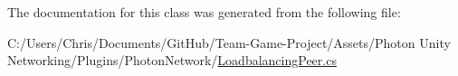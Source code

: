 The documentation for this class was generated from the following file\+:\begin{DoxyCompactItemize}
\item 
C\+:/\+Users/\+Chris/\+Documents/\+Git\+Hub/\+Team-\/\+Game-\/\+Project/\+Assets/\+Photon Unity Networking/\+Plugins/\+Photon\+Network/\hyperlink{_loadbalancing_peer_8cs}{Loadbalancing\+Peer.\+cs}\end{DoxyCompactItemize}
